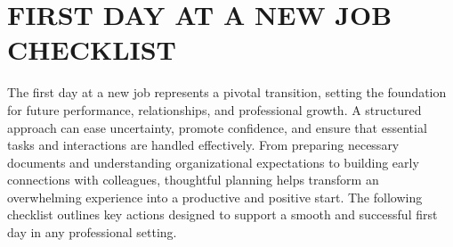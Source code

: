 
\section*{\centering FIRST DAY AT A NEW JOB CHECKLIST}
\vspace*{0.5cm}

The first day at a new job represents a pivotal transition, setting the foundation for future performance, relationships, and professional growth. A structured approach can ease uncertainty, promote confidence, and ensure that essential tasks and interactions are handled effectively. From preparing necessary documents and understanding organizational expectations to building early connections with colleagues, thoughtful planning helps transform an overwhelming experience into a productive and positive start. The following checklist outlines key actions designed to support a smooth and successful first day in any professional setting.

